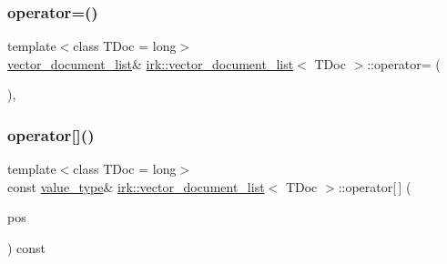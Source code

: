 \subsubsection{\texorpdfstring{operator=()}{operator=()}\hspace{0.1cm}{\footnotesize\ttfamily [2/2]}}
{\footnotesize\ttfamily template$<$class T\+Doc  = long$>$ \\
\mbox{\hyperlink{classirk_1_1vector__document__list}{vector\+\_\+document\+\_\+list}}\& \mbox{\hyperlink{classirk_1_1vector__document__list}{irk\+::vector\+\_\+document\+\_\+list}}$<$ T\+Doc $>$\+::operator= (\begin{DoxyParamCaption}\item[{\mbox{\hyperlink{classirk_1_1vector__document__list}{vector\+\_\+document\+\_\+list}}$<$ T\+Doc $>$ \&\&}]{ }\end{DoxyParamCaption})\hspace{0.3cm}{\ttfamily [default]}, {\ttfamily [noexcept]}}

\mbox{\label{classirk_1_1vector__document__list_a005d5854e07f49ade87827544cc88d7f}} 
\subsubsection{\texorpdfstring{operator[]()}{operator[]()}}
{\footnotesize\ttfamily template$<$class T\+Doc  = long$>$ \\
const \mbox{\hyperlink{classirk_1_1vector__document__list_a0ec9c56f5e12a3a9101b5a18b2fbe69f}{value\+\_\+type}}\& \mbox{\hyperlink{classirk_1_1vector__document__list}{irk\+::vector\+\_\+document\+\_\+list}}$<$ T\+Doc $>$\+::operator\mbox{[}$\,$\mbox{]} (\begin{DoxyParamCaption}\item[{std\+::size\+\_\+t}]{pos }\end{DoxyParamCaption}) const\hspace{0.3cm}{\ttfamily [inline]}}

\mbox{\label{classirk_1_1vector__document__list_ad7eac494d9c0aa784efaa1a4faa47616}} 
